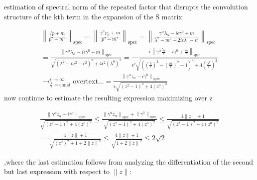 \documentclass[a4paper,12pt]{article}
\begin{document}
estimation of spectral norm of the repeated factor that disrupts the convolution structure of the kth term in the expansion of the S matrix

\begin{multline}%
\left\|\frac{\slash{p}+m}{p^2-m^2}\right\|_{\text{spec}}=\left\|\frac{\gamma^\alpha p_\alpha+m}{p^2-m^2}\right\|_{\text{spec}}
=\left\|\frac{\gamma^\alpha \lambda_\alpha -i\epsilon \gamma^0 +m}{\lambda^2-m^2 -2i \epsilon \lambda^0 -\epsilon^2}\right\|_{\text{spec}}
\\=\frac{\left\|\gamma^\alpha \lambda_\alpha -i\epsilon \gamma^0 +m\right\|_{\text{spec}}}{\sqrt{(\lambda^2-m^2  -\epsilon^2)^2+4 \epsilon^2 \left(\lambda^0\right)^2}}
=\frac{\epsilon\left\|\gamma^\alpha \frac{\lambda_\alpha}{\epsilon} -i \gamma^0 +\frac{m}{\epsilon}\right\|_{\text{spec}}}{\epsilon^2\sqrt{\left(\left(\frac{\lambda}{\epsilon}\right)^2-\left(\frac{m}{\epsilon}\right)^2  -1\right)^2+4  \left(\frac{\lambda^0}{\epsilon}\right)^2}}
\\\rightarrow^{\epsilon\rightarrow\infty}_{\frac{\lambda}{\epsilon}=\text{const}}\text{overtext...} =\frac{\left\|\gamma^\alpha z_\alpha -i \gamma^0 \right\|_{\text{spec}}}{\epsilon\sqrt{\left(z^2  -1\right)^2+4  \left(z^0\right)^2}}
\end{multline}
now continue to estimate the resulting expression maximizing over z

\begin{multline}
\frac{\left\|\gamma^\alpha z_\alpha -i \gamma^0 \right\|_{\text{spec}}}{\sqrt{\left(z^2  -1\right)^2+4  \left(z^0\right)^2}}
\le \frac{\left\|\gamma^\alpha z_\alpha \right\|_{\text{spec}} +\left\| \gamma^0 \right\|_{\text{spec}}}{\sqrt{\left(z^2  -1\right)^2+4  \left(z^0\right)^2}}
\le \frac{4 \| z\| +1}{\sqrt{\left(z^2  -1\right)^2+4  \left(z^0\right)^2}}
\\= \frac{4 \| z\| +1}{\sqrt{\left(z^2\right)^2  +1+2  \left\|z\right\|^2}}
\le \frac{4 \| z\| +1}{\sqrt{1+2  \left\|z\right\|^2}}\le 2\sqrt{2}
\end{multline}

,where the last estimation follows from analyzing the differentiation of the second but last expression with respect to \(\| z \|\):
\end{document}
